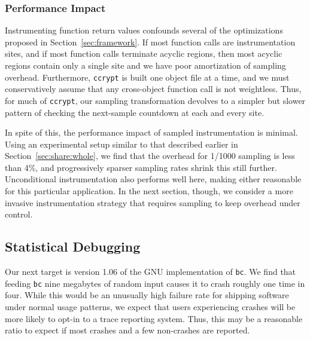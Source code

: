 \subsubsection{Performance Impact}

Instrumenting function return values confounds several of the
optimizations proposed in Section~\ref{sec:framework}.  If most
function calls are instrumentation sites, and if most function calls
terminate acyclic regions, then most acyclic regions contain only a
single site and we have poor amortization of sampling overhead.
Furthermore, \texttt{ccrypt} is built one object file at a time, and
we must conservatively assume that any cross-object function call is
not weightless.  Thus, for much of \texttt{ccrypt}, our sampling
transformation devolves to a simpler but slower pattern of checking
the next-sample countdown at each and every site.


In spite of this, the performance impact of sampled instrumentation is
minimal.  Using an experimental setup similar to that described
earlier in Section~\ref{sec:share:whole}, we find that the overhead
for 1/1000 sampling is less than 4\%, and progressively sparser
sampling rates shrink this still further.  Unconditional
instrumentation also performs well here, making either reasonable for
this particular application.  In the next section, though, we consider
a more invasive instrumentation strategy that requires sampling to
keep overhead under control.

\subsection{Statistical Debugging}
\label{sec:bc}

Our next target is version 1.06 of the GNU implementation of
\texttt{bc}.  We find that feeding \texttt{bc} nine megabytes of
random input causes it to crash roughly one time in four.  While this
would be an unusually high failure rate for shipping software under
normal usage patterns, we expect that users experiencing crashes will
be more likely to opt-in to a trace reporting system.  Thus, this may
be a reasonable ratio to expect if most crashes and a few non-crashes
are reported.

